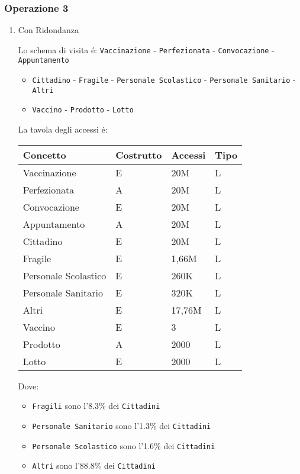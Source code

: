 \documentclass[11pt]{article}
\begin{document}
\subsubsection{Operazione 3}
\label{sec:orgfff760e}
\begin{enumerate}
\item Con Ridondanza
\label{sec:orgd8a03f4}

Lo schema di visita é:
\texttt{Vaccinazione} - \texttt{Perfezionata} - \texttt{Convocazione} - \texttt{Appuntamento}
\begin{itemize}
\item \texttt{Cittadino} - \texttt{Fragile} - \texttt{Personale Scolastico} - \texttt{Personale Sanitario} - \texttt{Altri}
\item \texttt{Vaccino} - \texttt{Prodotto} - \texttt{Lotto}
\end{itemize}

La tavola degli accessi é:
\begin{center}
\begin{tabular}{llll}
Concetto & Costrutto & Accessi & Tipo\\
\hline
Vaccinazione & E & 20M & L\\
Perfezionata & A & 20M & L\\
Convocazione & E & 20M & L\\
Appuntamento & A & 20M & L\\
Cittadino & E & 20M & L\\
Fragile & E & 1,66M & L\\
Personale Scolastico & E & 260K & L\\
Personale Sanitario & E & 320K & L\\
Altri & E & 17,76M & L\\
Vaccino & E & 3 & L\\
Prodotto & A & 2000 & L\\
Lotto & E & 2000 & L\\
\end{tabular}
\end{center}

Dove:
\begin{itemize}
\item \texttt{Fragili} sono l'8.3\% dei \texttt{Cittadini}
\item \texttt{Personale Sanitario} sono l'1.3\% dei \texttt{Cittadini}
\item \texttt{Personale Scolastico} sono l'1.6\% dei \texttt{Cittadini}
\item \texttt{Altri} sono l'88.8\% dei \texttt{Cittadini}
\end{itemize}


\end{enumerate}
\end{document}
